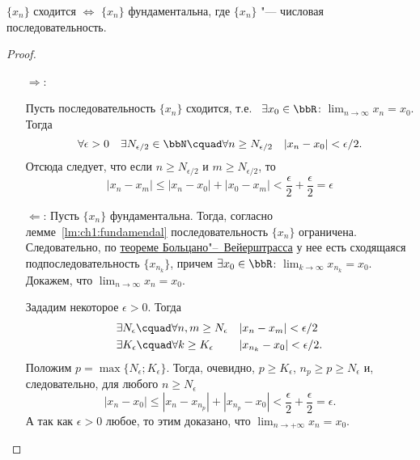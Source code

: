 \begin{thm} 
$\{x_n\}$ сходится $\Longleftrightarrow$ $\{x_n\}$ фундаментальна, где $\{x_n\}$ "--- числовая последовательность.
\end{thm}
\begin{proof}\leavevmode
\begin{itemize}[wide, labelwidth=!, labelindent=0pt]
\item[$\Longrightarrow$:]

Пусть последовательность $\{x_n\}$ сходится, т.е.~ $\exists x_{0} \in \bbR$:  $\lim_{n \to \infty}\limits x_n = x_0$. Тогда 
$$
\forall \epsilon > 0\quad \exists N_{\epsilon/2} \in \bbN\cquad \forall n \ge N_{\epsilon/2}\quad |x_n-x_0|<\epsilon/2.
$$
Отсюда следует, что если $n \ge N_{\epsilon/2}$ и $m \ge N_{\epsilon/2}$, то
$$
|x_n-x_m| \le |x_n-x_0|+|x_0-x_m| <\frac{\epsilon}{2}+\frac{\epsilon}{2}=\epsilon
$$

\item[$\Longleftarrow$:]
Пусть $\{x_n\}$ фундаментальна. Тогда, согласно лемме~\ref{lm:ch1:fundamendal} последовательность $\{x_n\}$ ограничена. Следовательно, по \hyperref[th:ch1:TBV]{теореме Больцано"--~Вейерштрасса} у нее есть сходящаяся подпоследовательность $\{x_{n_k}\}$, причем $\exists x_0 \in \bbR$: $\lim_{k \to \infty}\limits x_{n_k} =x_0 $. Докажем, что $\lim_{n \to \infty}\limits x_{n}=x_0 $.

Зададим некоторое $\epsilon > 0$. Тогда
\begin{gather*}
\begin{aligned}
& \exists N_\epsilon\cquad \forall n,m \ge N_\epsilon &&|x_n-x_m|<\epsilon/2\\
& \exists K_\epsilon\cquad \forall k \ge K_\epsilon   &&|x_{n_k}-x_0|<\epsilon/2.
\end{aligned}
\end{gather*}
Положим $p=\max\{N_\epsilon;K_\epsilon\}$. Тогда, очевидно, $p \ge K_\epsilon$, $n_p \ge p \ge N_\epsilon$ и, следовательно, для любого $n \ge N_\epsilon$
$$
|x_n-x_0| \le |x_n-x_{n_p}|+|x_{n_p}-x_0|<\frac{\epsilon}{2}+\frac{\epsilon}{2}=\epsilon.
$$
А так как $\epsilon > 0$ любое, то этим доказано, что $\lim_{n \to +\infty}\limits x_n = x_0$. \qedhere
\end{itemize}
\end{proof}
